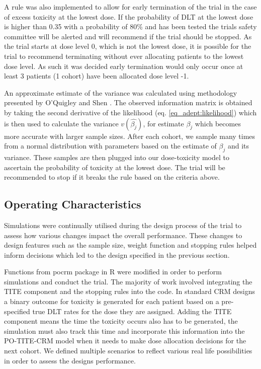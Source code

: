 A rule was also implemented to allow for early termination of the trial in the case of excess toxicity at the lowest dose. If the probability of DLT at the lowest dose is higher than 0.35 with a probability of 80\% and has been tested the trials safety committee will be alerted and will recommend if the trial should be stopped. As the trial starts at dose level 0, which is not the lowest dose, it is possible for the trial to recommend terminating without ever allocating patients to the lowest dose level. As such it was decided early termination would only occur once at least 3 patients (1 cohort) have been allocated dose level -1. 

An approximate estimate of the variance was calculated using methodology presented by O'Quigley and Shen \cite{oquigleyContinualReassessmentMethod1996}. The observed information matrix is obtained by taking the second derivative of the likelihood (eq. \ref{eq_adept:likelihood}) which is then used to calculate the variance $v(\hat{\beta_j})$, for estimate $\beta_j$ which becomes more accurate with larger sample sizes. After each cohort, we sample many times from a normal distribution with parameters based on the estimate of $\beta_j$ and its variance. These samples are then plugged into our dose-toxicity model to ascertain the probability of toxicity at the lowest dose. The trial will be recommended to stop if it breaks the rule based on the criteria above. 


\subsection{Operating Characteristics}
\label{adept:OCs} 

Simulations were continually utilised during the design process of the trial to assess how various changes impact the overall performance. These changes to design features such as the sample size, weight function and stopping rules helped inform decisions which led to the design specified in the previous section.  

Functions from pocrm package in R \cite{wagesPocrmRpackagePhase2013, wagesPocrmDoseFinding2019} were modified in order to perform simulations and conduct the trial. The majority of work involved integrating the TITE component and the stopping rules into the code. In standard CRM designs a binary outcome for toxicity is generated for each patient based on a pre-specified true DLT rates for the dose they are assigned. Adding the TITE component means the time the toxicity occurs also has to be generated, the simulation must also track this time and incorporate this information into the PO-TITE-CRM model when it needs to make dose allocation decisions for the next cohort. We defined multiple scenarios to reflect various real life possibilities in order to assess the designs performance.  


